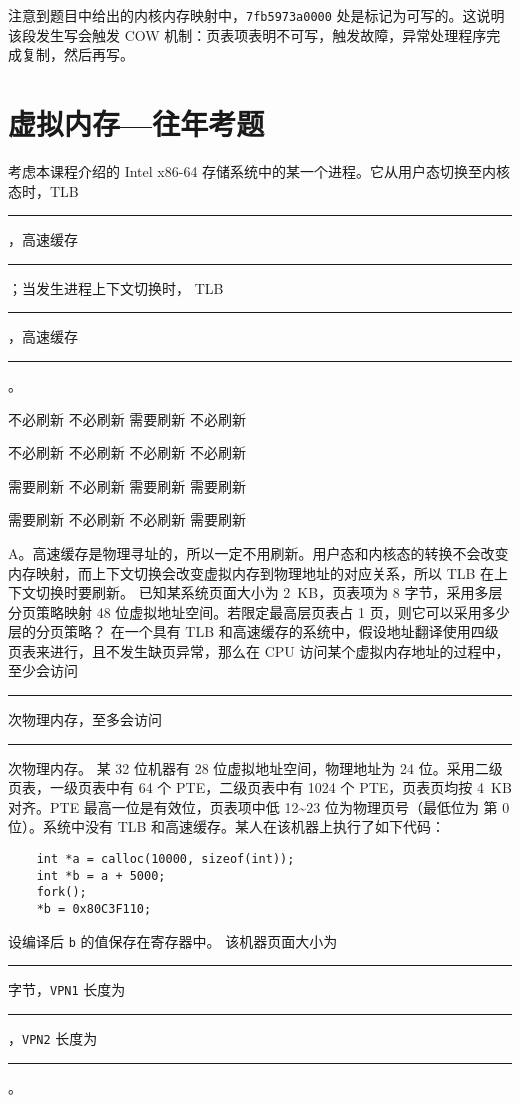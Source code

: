 \begin{problems}
        注意到题目中给出的内核内存映射中，\verb|7fb5973a0000| 处是标记为可写的。这说明该段发生写会触发 COW 机制：页表项表明不可写，触发故障，异常处理程序完成复制，然后再写。
    \end{problems}

\chapter{虚拟内存{---}往年考题}\thispagestyle{empty}
    \begin{problems}
         考虑本课程介绍的 Intel x86-64 存储系统中的某一个进程。它从用户态切换至内核态时，TLB \rule{2.5cm}{0.25mm}，高速缓存 \rule{2.5cm}{0.25mm}；当发生进程上下文切换时， TLB \rule{2.5cm}{0.25mm}，高速缓存 \rule{2.5cm}{0.25mm}。
        \begin{choices}
            \item 不必刷新 \quad 不必刷新 \quad 需要刷新 \quad 不必刷新
            \item 不必刷新 \quad 不必刷新 \quad 不必刷新 \quad 不必刷新
            \item 需要刷新 \quad 不必刷新 \quad 需要刷新 \quad 需要刷新
            \item 需要刷新 \quad 不必刷新 \quad 不必刷新 \quad 需要刷新
        \end{choices}
        \sol A。高速缓存是物理寻址的，所以一定不用刷新。用户态和内核态的转换不会改变内存映射，而上下文切换会改变虚拟内存到物理地址的对应关系，所以 TLB 在上下文切换时要刷新。
         已知某系统页面大小为 \SI{2}{KB}，页表项为 8 字节，采用多层分页策略映射 48 位虚拟地址空间。若限定最高层页表占 1 页，则它可以采用多少层的分页策略？
         在一个具有 TLB 和高速缓存的系统中，假设地址翻译使用四级页表来进行，且不发生缺页异常，那么在 CPU 访问某个虚拟内存地址的过程中，至少会访问 \rule{2.5cm}{0.25mm} 次物理内存，至多会访问 \rule{2.5cm}{0.25mm} 次物理内存。
         某 32 位机器有 28 位虚拟地址空间，物理地址为 24 位。采用二级页表，一级页表中有 64 个 PTE，二级页表中有 1024 个 PTE，页表页均按 \SI{4}{KB} 对齐。PTE 最高一位是有效位，页表项中低 12\textasciitilde 23 位为物理页号（最低位为 第 0 位）。系统中没有 TLB 和高速缓存。某人在该机器上执行了如下代码：
        \begin{verbatim}
    int *a = calloc(10000, sizeof(int));
    int *b = a + 5000;
    fork();
    *b = 0x80C3F110;
        \end{verbatim}
        设编译后 \verb|b| 的值保存在寄存器中。
        \qn 该机器页面大小为 \rule{2.5cm}{0.25mm} 字节，\verb|VPN1| 长度为 \rule{2.5cm}{0.25mm}，\verb|VPN2| 长度为 \rule{2.5cm}{0.25mm}。

\end{problems}
